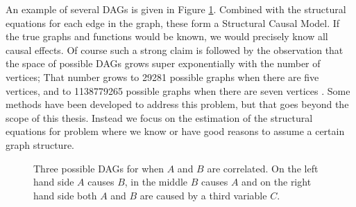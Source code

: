 \documentclass{article}
\begin{document}
An example of several DAGs is given in Figure \ref{fig:graph_correlations_A_B}. Combined with the structural equations for each edge in the graph, these form a Structural Causal Model. If the true graphs and functions would be known, we would precisely know all causal effects. Of course such a strong claim is followed by the observation that the space of possible DAGs grows super exponentially with the number of vertices; That number grows to 29281 possible graphs when there are five vertices, and to 1138779265 possible graphs when there are seven vertices \cite{robinson1977counting}. Some methods have been developed to address this problem, but that goes beyond the scope of this thesis. Instead we focus on the estimation of the structural equations for problem where we know or have good reasons to assume a certain graph structure.



\begin{figure}
    \centering
    \qquad
    \qquad
    \caption{Three possible DAGs for when $A$ and $B$ are correlated. On the left hand side $A$ causes $B$, in the middle $B$ causes $A$ and on the right hand side both $A$ and $B$ are caused by a third variable $C$.}
    \label{fig:graph_correlations_A_B}
\end{figure}
\end{document}
